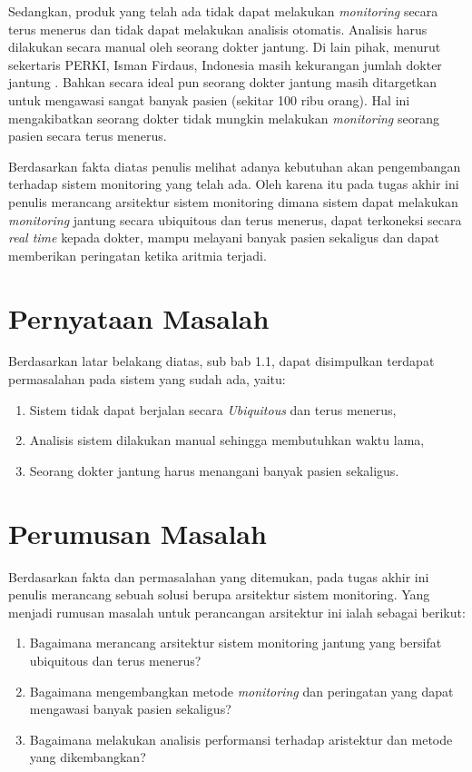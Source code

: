 Sedangkan, produk yang telah ada tidak dapat melakukan \textit{monitoring} secara terus menerus dan tidak dapat melakukan analisis otomatis. Analisis harus dilakukan secara manual oleh seorang dokter jantung. Di lain pihak, menurut sekertaris PERKI, Isman Firdaus, Indonesia masih kekurangan jumlah dokter jantung \cite{doctor_deff}. Bahkan secara ideal pun seorang dokter jantung masih ditargetkan untuk mengawasi sangat banyak pasien (sekitar 100 ribu orang)\cite{doctor_deff}. Hal ini mengakibatkan seorang dokter tidak mungkin melakukan \textit{monitoring} seorang pasien secara terus menerus.

Berdasarkan fakta diatas penulis melihat adanya kebutuhan akan pengembangan terhadap sistem monitoring yang telah ada. Oleh karena itu pada tugas akhir ini penulis merancang arsitektur sistem monitoring dimana sistem dapat melakukan \textit{monitoring} jantung secara ubiquitous dan terus menerus, dapat terkoneksi secara \textit{real time} kepada dokter, mampu melayani banyak pasien sekaligus dan dapat memberikan peringatan ketika aritmia terjadi.
\section{Pernyataan Masalah}
Berdasarkan latar belakang diatas, sub bab 1.1, dapat disimpulkan terdapat permasalahan pada sistem yang sudah ada, yaitu:
\begin{enumerate}
	\item Sistem tidak dapat berjalan secara \textit{Ubiquitous} dan terus menerus,
	\item Analisis sistem dilakukan manual sehingga membutuhkan waktu lama,
	\item Seorang dokter jantung harus menangani banyak pasien sekaligus.
\end{enumerate}
\section{Perumusan Masalah}
Berdasarkan fakta dan permasalahan yang ditemukan, pada tugas akhir ini penulis merancang sebuah solusi berupa arsitektur sistem monitoring. Yang menjadi rumusan masalah untuk perancangan arsitektur ini ialah sebagai berikut:
\begin{enumerate}
	\item Bagaimana merancang arsitektur sistem monitoring jantung yang bersifat ubiquitous dan terus menerus?
	\item Bagaimana mengembangkan metode \textit{monitoring} dan peringatan yang dapat mengawasi banyak pasien sekaligus?
	\item Bagaimana melakukan analisis performansi terhadap aristektur dan metode yang dikembangkan?
\end{enumerate}
